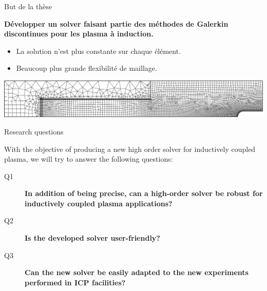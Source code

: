 \documentclass[24pt,t,table, aspectratio=169]{beamer}
\begin{document}
\begin{frame}{But de la thèse}

\begin{framed}
\textbf{Développer un solver faisant partie des méthodes de Galerkin discontinues pour les plasma à induction.}
\end{framed}

\begin{itemize}
\item La solution n'est plus constante sur chaque élément.
\item Beaucoup plus grande flexibilité de maillage.
\end{itemize}

\begin{center}
\includegraphics[width=.8\linewidth]{./Grid_Independence_mesh_probe_cropped.pdf}
\end{center}

\end{frame}

\begin{frame}{Research questions}

With the objective of producing a new high order solver for inductively coupled plasma, we will try to answer the following questions:

\begin{framed}
\begin{description}
\item[Q1] \textbf{In addition of being precise, can a high-order solver be robust for inductively coupled plasma applications?}
\item[Q2] \textbf{Is the developed solver user-friendly?} 
\item[Q3] \textbf{Can the new solver be easily adapted to the new experiments performed in ICP facilities?}
\end{description}
\end{framed}

\end{frame}
\end{document}
